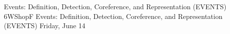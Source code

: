\begin{wsschedule}
{Events: Definition, Detection, Coreference, and Representation (EVENTS)}
{6}{WShopF}
{Events: Definition, Detection, Coreference, and Representation (EVENTS)}
{Friday, June 14}{\WShopLocF}

\end{wsschedule}
